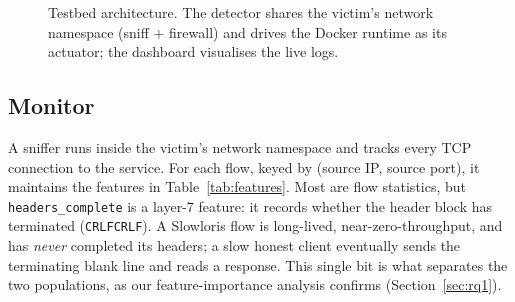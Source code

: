 \documentclass[conference]{IEEEtran}
\begin{document}
\begin{figure}[t]
\centering
{}
\caption{Testbed architecture. The detector shares the victim's network namespace
(sniff + firewall) and drives the Docker runtime as its actuator; the dashboard
visualises the live logs.}
\label{fig:arch}
\end{figure}

\subsection{Monitor}
A sniffer runs inside the victim's network namespace and tracks every TCP
connection to the service. For each flow, keyed by (source IP, source port), it
maintains the features in Table~\ref{tab:features}. Most are flow statistics, but
\texttt{headers\_complete} is a layer-7 feature: it records whether the header
block has terminated (\texttt{CRLFCRLF}). A Slowloris flow is long-lived,
near-zero-throughput, and has \emph{never} completed its headers; a slow honest
client eventually sends the terminating blank line and reads a response. This
single bit is what separates the two populations, as our feature-importance
analysis confirms (Section~\ref{sec:rq1}).
\end{document}
